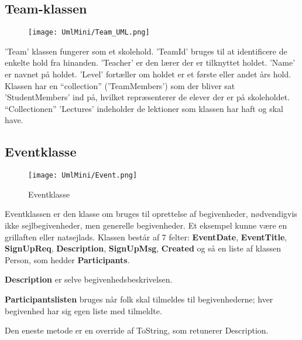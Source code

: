 \subsection{Team-klassen}
\begin{minipage}[t]{1\linewidth}
\begin{wrapfigure}{l}{0.5\textwidth}
\texttt{[image: UmlMini/Team\_UML.png]}
\end{wrapfigure}

'Team' klassen fungerer som et skolehold. 'TeamId' bruges til at identificere de enkelte hold fra hinanden. 'Teacher' er den lærer der er tilknyttet holdet. 'Name' er navnet på holdet. 'Level' fortæller om holdet er et første eller andet års hold. Klassen har en ``collection'' ('TeamMembers') som der bliver sat 'StudentMembers' ind på, hvilket repræsenterer de elever der er på skoleholdet. ``Collectionen'' 'Lectures' indeholder de lektioner som klassen har haft og skal have. 

\end{minipage}
 
 
\subsection{Eventklasse}

\begin{wrapfigure}{l}{0.5\textwidth}
    \label{img:login_interface}
    \vspace{-20pt}
    \begin{center}
        \texttt{[image: UmlMini/Event.png]}
    \end{center}
    \vspace{-20pt}
    \caption{Eventklasse}
    \vspace{-10pt}
\end{wrapfigure}
Eventklassen er den klasse om bruges til oprettelse af  begivenheder, nødvendigvis ikke sejlbegivenheder, men generelle begivenheder. Et eksempel kunne være en grillaften eller natsejlads. Klassen består af 7 felter: \textbf{EventDate}, \textbf{EventTitle}, \textbf{SignUpReq}, \textbf{Description}, \textbf{SignUpMsg}, \textbf{Created} og så en liste af klassen Person, som hedder \textbf{Participants}.

\textbf{Description} er selve begivenhedsbeskrivelsen. 

\textbf{Participantslisten} bruges når folk skal tilmeldes til begivenhederne; hver begivenhed har sig egen liste med tilmeldte. 

Den eneste metode er en override af ToString, som retunerer Description.

